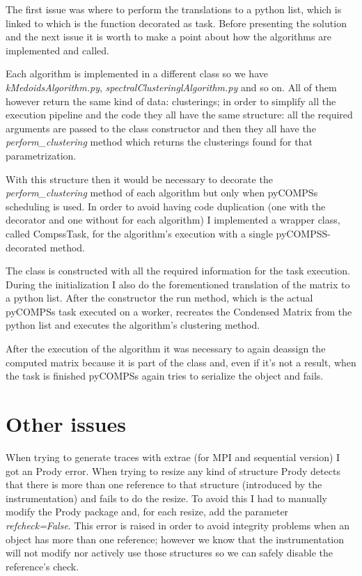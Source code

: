 The first issue was where to perform the translations to a python list, which is linked to which is the function decorated as task. Before presenting the solution and the next issue it is worth to make a point about how the algorithms are implemented and called. 

Each algorithm is implemented in a different class so we have \textit{kMedoidsAlgorithm.py}, \textit{spectralClusteringlAlgorithm.py} and so on. All of them however return the same kind of data: clusterings; in order to simplify all the execution pipeline and the code they all have the same structure: all the required arguments are passed to the class constructor and then they all have the \textit{perform\_clustering} method which returns the clusterings found for that parametrization. 

With this structure then it would be necessary to decorate the \textit{perform\_clustering} method of each algorithm but only when pyCOMPSs scheduling is used. In order to avoid having code duplication (one with the decorator and one without for each algorithm) I implemented a wrapper class, called CompssTask, for the algorithm's execution with a single pyCOMPSS-decorated method.

The class is constructed with all the required information for the task execution. During the initialization I also do the forementioned translation of the matrix to a python list. After the constructor the run method, which is the actual pyCOMPSs task executed on a worker, recreates the Condensed Matrix from the python list and executes the algorithm's clustering method. 

After the execution of the algorithm it was necessary to again deassign the computed matrix because it is part of the class and, even if it's not a result, when the task is finished pyCOMPSs again tries to serialize the object and fails.

\section{Other issues}


When trying to generate traces with extrae (for MPI and sequential version) I got an Prody error. When trying to resize any kind of structure Prody detects that there is more than one reference to that structure (introduced by the instrumentation) and fails to do the resize. To avoid this I had to manually modify the Prody package and, for each resize, add the parameter \textit{refcheck=False}. This error is raised in order to avoid integrity problems when an object has more than one reference; however we know that the instrumentation will not modify nor actively use those structures so we can safely disable the reference's check. 

